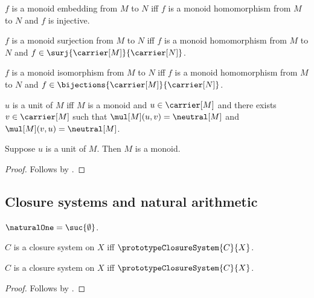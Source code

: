 \begin{definition}\label{spike_phrase_monoid_embedding}
    $f$ is a monoid embedding from $M$ to $N$ iff
        $f$ is a monoid homomorphism from $M$ to $N$ and
        $f$ is injective.
\end{definition}

\begin{definition}\label{spike_phrase_monoid_surjection}
    $f$ is a monoid surjection from $M$ to $N$ iff
        $f$ is a monoid homomorphism from $M$ to $N$ and
        $f\in\surj{\carrier[M]}{\carrier[N]}$.
\end{definition}

\begin{definition}\label{spike_phrase_monoid_isomorphism}
    $f$ is a monoid isomorphism from $M$ to $N$ iff
        $f$ is a monoid homomorphism from $M$ to $N$ and
        $f\in\bijections{\carrier[M]}{\carrier[N]}$.
\end{definition}

\begin{definition}\label{spike_phrase_monoid_unit}
    $u$ is a unit of $M$ iff
        $M$ is a monoid and $u\in\carrier[M]$ and
        there exists $v\in\carrier[M]$ such that
            $\mul[M](u,v)=\neutral[M]$ and
            $\mul[M](v,u)=\neutral[M]$.
\end{definition}

\begin{proposition}\label{spike_phrase_monoid_unit_guard}
    Suppose $u$ is a unit of $M$.
    Then $M$ is a monoid.
\end{proposition}
\begin{proof}
    Follows by .
\end{proof}

\subsection{Closure systems and natural arithmetic}

\begin{definition}\label{spike_phrase_natural_one}
    $\naturalOne=\suc{\emptyset}$.
\end{definition}

\begin{definition}\label{spike_phrase_closure_system}
    $C$ is a closure system on $X$ iff
        $\prototypeClosureSystem{C}{X}$.
\end{definition}

\begin{theorem}\label{spike_phrase_closure_system_equivalence}
    $C$ is a closure system on $X$ iff
        $\prototypeClosureSystem{C}{X}$.
\end{theorem}
\begin{proof}
    Follows by .
\end{proof}

